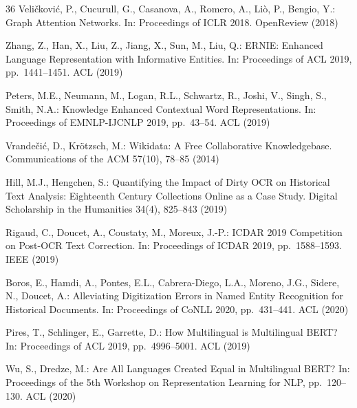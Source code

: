 \documentclass[11pt,a4paper]{article}
\begin{document}
\begin{thebibliography}{36}
Veli\v{c}kovi\'{c}, P., Cucurull, G., Casanova, A., Romero, A., Li\`{o}, P., Bengio, Y.:
Graph Attention Networks.
In: Proceedings of ICLR 2018. OpenReview (2018)



Zhang, Z., Han, X., Liu, Z., Jiang, X., Sun, M., Liu, Q.:
ERNIE: Enhanced Language Representation with Informative Entities.
In: Proceedings of ACL 2019, pp.~1441--1451. ACL (2019)

Peters, M.E., Neumann, M., Logan, R.L., Schwartz, R., Joshi, V., Singh, S., Smith, N.A.:
Knowledge Enhanced Contextual Word Representations.
In: Proceedings of EMNLP-IJCNLP 2019, pp.~43--54. ACL (2019)

Vrande\v{c}i\'c, D., Kr\"otzsch, M.:
Wikidata: A Free Collaborative Knowledgebase.
Communications of the ACM 57(10), 78--85 (2014)


Hill, M.J., Hengchen, S.:
Quantifying the Impact of Dirty OCR on Historical Text Analysis: Eighteenth Century Collections Online as a Case Study.
Digital Scholarship in the Humanities 34(4), 825--843 (2019)

Rigaud, C., Doucet, A., Coustaty, M., Moreux, J.-P.:
ICDAR 2019 Competition on Post-OCR Text Correction.
In: Proceedings of ICDAR 2019, pp.~1588--1593. IEEE (2019)

Boros, E., Hamdi, A., Pontes, E.L., Cabrera-Diego, L.A., Moreno, J.G., Sidere, N., Doucet, A.:
Alleviating Digitization Errors in Named Entity Recognition for Historical Documents.
In: Proceedings of CoNLL 2020, pp.~431--441. ACL (2020)


Pires, T., Schlinger, E., Garrette, D.:
How Multilingual is Multilingual BERT?
In: Proceedings of ACL 2019, pp.~4996--5001. ACL (2019)

Wu, S., Dredze, M.:
Are All Languages Created Equal in Multilingual BERT?
In: Proceedings of the 5th Workshop on Representation Learning for NLP, pp.~120--130. ACL (2020)


\end{thebibliography}
\end{document}
